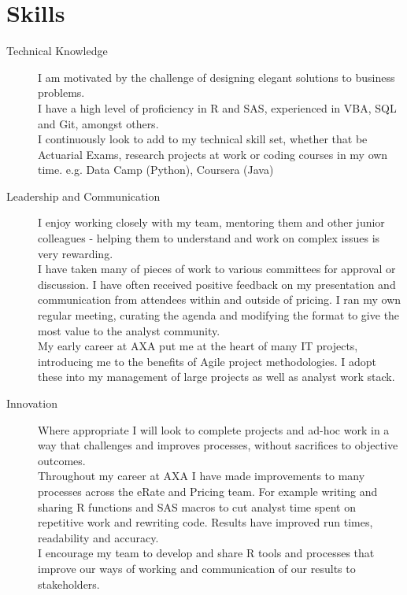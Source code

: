 \documentclass[11pt]{article}
\begin{document}
\section*{Skills}
\begin{description}

\item[Technical Knowledge] I am motivated by the challenge of designing elegant solutions to business problems. \\
I have a high level of proficiency in R and SAS, experienced in VBA, SQL and Git, amongst others.\\
I continuously look to add to my technical skill set, whether that be Actuarial Exams, research projects at work or coding courses in my own time. e.g. Data Camp (Python), Coursera (Java)

\item[Leadership and Communication] I enjoy working closely with my team, mentoring them and other junior colleagues - helping them to understand and work on complex issues is very rewarding. \\
I have taken many of pieces of work to various committees for approval or discussion. I have often received positive feedback on my presentation and communication from attendees within and outside of pricing. I ran my own regular meeting, curating the agenda and modifying the format to give the most value to the analyst community.\\
My early career at AXA put me at the heart of many IT projects, introducing me to the benefits of Agile project methodologies. I adopt these into my management of large projects as well as analyst work stack.

\item[Innovation] Where appropriate I will look to complete projects and ad-hoc work in a way that challenges and improves processes, without sacrifices to objective outcomes.\\
Throughout my career at AXA I have made improvements to many processes across the eRate and Pricing team. For example writing and sharing R functions and SAS macros to cut analyst time spent on repetitive work and rewriting code. Results have improved run times, readability and accuracy.\\
I encourage my team to develop and share R tools and processes that improve our ways of working and communication of our results to stakeholders.

\end{description} 
\end{document}
